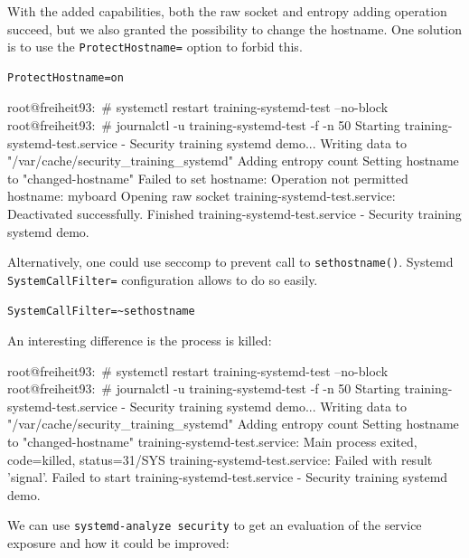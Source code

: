 With the added capabilities, both the raw socket and entropy adding operation succeed,
but we also granted the possibility to change the hostname.
One solution is to use the \texttt{ProtectHostname=} option to forbid this.

\begin{verbatim}
ProtectHostname=on
\end{verbatim}

\begin{bashinput}
root@freiheit93:~# systemctl restart training-systemd-test --no-block
root@freiheit93:~# journalctl -u training-systemd-test -f -n 50
Starting training-systemd-test.service - Security training systemd demo...
Writing data to "/var/cache/security_training_systemd"
Adding entropy count
Setting hostname to "changed-hostname"
Failed to set hostname: Operation not permitted
hostname: myboard
Opening raw socket
training-systemd-test.service: Deactivated successfully.
Finished training-systemd-test.service - Security training systemd demo.
\end{bashinput}

Alternatively, one could use seccomp to prevent call to \texttt{sethostname()}.
Systemd \texttt{SystemCallFilter=} configuration allows to do so easily.

\begin{verbatim}
SystemCallFilter=~sethostname
\end{verbatim}

An interesting difference is the process is killed:

\begin{bashinput}
root@freiheit93:~# systemctl restart training-systemd-test --no-block
root@freiheit93:~# journalctl -u training-systemd-test -f -n 50
Starting training-systemd-test.service - Security training systemd demo...
Writing data to "/var/cache/security_training_systemd"
Adding entropy count
Setting hostname to "changed-hostname"
training-systemd-test.service: Main process exited, code=killed, status=31/SYS
training-systemd-test.service: Failed with result 'signal'.
Failed to start training-systemd-test.service - Security training systemd demo.
\end{bashinput}

We can use \texttt{systemd-analyze security} to get an evaluation of the service
exposure and how it could be improved:

